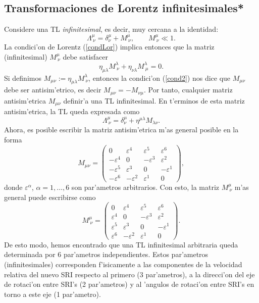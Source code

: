 \subsection{Transformaciones de Lorentz infinitesimales*}
Considere una TL \textit{infinitesimal}, es decir, muy cercana a la identidad:
\begin{equation}
\Lambda^\mu_{\ \nu}=\delta^\mu_\nu+M^\mu_{\ \nu}, \qquad M^\mu_{\ \nu}\ll 1.
\end{equation}
La condici'on de Lorentz (\ref{condLor}) implica entonces que la matriz
(infinitesimal) $M^\mu_{\ \nu}$ debe satisfacer
\begin{equation}
\eta_{\mu\lambda}M^\lambda_{\ \nu}+\eta_{\nu\lambda}M^\lambda_{\ \mu}=0.
\label{cond2}
\end{equation}
Si definimos $M_{\mu\nu}:=\eta_{\mu\lambda}M^\lambda_{\  \nu}$, entonces la
condici'on (\ref{cond2}) nos dice que $M_{\mu\nu}$ debe ser antisim'etrico, es
decir $M_{\mu\nu}=-M_{\nu\mu}$. Por tanto, cualquier matriz antisim'etrica
$M_{\mu\nu}$ definir'a una TL infinitesimal. En t'erminos de esta matriz
antisim'etrica, la TL queda expresada como
\begin{equation}
\Lambda^\mu_{\ \nu}=\delta^\mu_\nu+\eta^{\mu\lambda}M_{\lambda\nu}.
\end{equation}
Ahora, es posible escribir la matriz antisim'etrica m'as general posible en la
forma
\begin{equation}
M_{\mu\nu}=\left( \begin{array}{cccc}
0 & \varepsilon^4 & \varepsilon^{5} & \varepsilon^{6} \\
-\varepsilon^4 & 0 & -\varepsilon^3 & \varepsilon^2 \\
-\varepsilon^{5} & \varepsilon^3 & 0 & -\varepsilon^1 \\
-\varepsilon^{6} & -\varepsilon^2 & \varepsilon^1 & 0
\end{array}
\right) ,
\end{equation}
donde $\varepsilon^\alpha$, $\alpha=1,\dots,6$ son par'ametros arbitrarios. Con
esto, la matriz $M^\mu_{\ \nu}$ m'as general puede escribirse como
\begin{equation}
M^\mu_{\ \nu}=\left( \begin{array}{cccc}
0 & \varepsilon ^4 & \varepsilon ^{5} & \varepsilon ^{6} \\
\varepsilon ^4 & 0 & -\varepsilon ^3 & \varepsilon^2 \\
\varepsilon ^{5} & \varepsilon ^3 & 0 & -\varepsilon ^1 \\
\varepsilon ^{6} & -\varepsilon^2 & \varepsilon ^1 & 0
\end{array}
\right) .\label{Marab}
\end{equation}
De esto modo, hemos encontrado que una TL infinitesimal arbitraria queda
determinada por 6 par'ametros independientes. Estos par'ametros
(infinitesimales) corresponden f'isicamente a las componentes de la velocidad
relativa del nuevo SRI respecto al primero (3 par'ametros), a la direcci'on del
eje de rotaci'on entre SRI's (2 par'ametros) y al 'angulos de rotaci'on entre
SRI's en torno a este eje (1 par'ametro).

